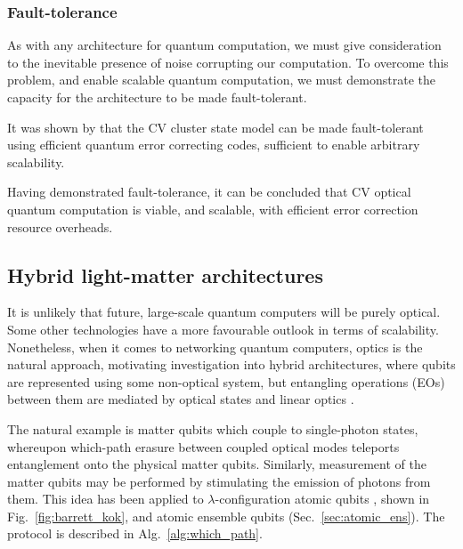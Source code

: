 
\subsubsection{Fault-tolerance}

As with any architecture for quantum computation, we must give consideration to the inevitable presence of noise corrupting our computation. To overcome this problem, and enable scalable quantum computation, we must demonstrate the capacity for the architecture to be made fault-tolerant.

It was shown by \cite{bib:menicucciFTCVCS} that the CV cluster state model can be made fault-tolerant using efficient quantum error correcting codes, sufficient to enable arbitrary scalability.

Having demonstrated fault-tolerance, it can be concluded that CV optical quantum computation is viable, and scalable, with efficient error correction resource overheads.

%
%

\subsection{Hybrid light-matter architectures} \label{sec:hybrid} 

It is unlikely that future, large-scale quantum computers will be purely optical. Some other technologies have a more favourable outlook in terms of scalability. Nonetheless, when it comes to networking quantum computers, optics is the natural approach, motivating investigation into hybrid architectures, where qubits are represented using some non-optical system, but entangling operations (EOs) between them are mediated by optical states and linear optics \cite{bib:Duan06, bib:Beugnon06}.

The natural example is matter qubits which couple to single-photon states, whereupon which-path erasure between coupled optical modes teleports entanglement onto the physical matter qubits. Similarly, measurement of the matter qubits may be performed by stimulating the emission of photons from them. This idea has been applied to $\lambda$-configuration atomic qubits \cite{bib:BarrettKok05}, shown in Fig.~\ref{fig:barrett_kok}, and atomic ensemble qubits \cite{bib:RohdeAtEns10} (Sec.~\ref{sec:atomic_ens}). The protocol is described in Alg.~\ref{alg:which_path}.

